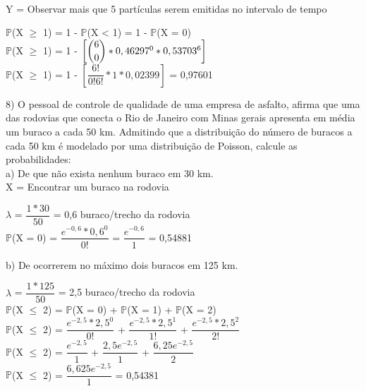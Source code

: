 \documentclass[12pt,a4paper]{article}
\begin{document}
	\vspace{0.5cm}\\
	Y = Observar mais que 5 partículas serem emitidas no intervalo de tempo
	\begin{center}
		\vspace{0.5cm}
		$\mathbb{P}$(X $\geq$ 1) = 1 -	$\mathbb{P}$(X < 1) = 1 -	$\mathbb{P}$(X = 0)
		\vspace{0.5cm}\\
		$\mathbb{P}$(X $\geq$ 1) = 1 - $\left[\dbinom{6}{0} * 0,46297^{0} * 0,53703^{6}\right]$ 
		\vspace{0.5cm}\\
		$\mathbb{P}$(X $\geq$ 1) = 1 - $\left[\dfrac{6!}{0!6!} * 1 * 0,02399\right]$ = 0,97601
	\end{center}
	\vspace{1cm}
	8) O pessoal de controle de qualidade de uma empresa de asfalto, afirma que uma das rodovias que conecta o Rio de Janeiro com Minas gerais apresenta em média um buraco a cada 50 km. Admitindo que a distribuição do número de buracos a	cada 50 km é modelado por uma distribuição de Poisson, calcule as	probabilidades:\\
	a) De que não exista nenhum buraco em 30 km.
	\vspace{0.5cm}\\
	X = Encontrar um buraco na rodovia
	\begin{center}
		\vspace{0.5cm}
		$\lambda$ = $\dfrac{1 * 30}{50}$ = 0,6 buraco/trecho da rodovia
		\vspace{1cm}\\
		$\mathbb{P}$(X = 0) = $\dfrac{e^{-0,6} * 0,6^{0}}{0!}$ = $\dfrac{e^{-0,6}}{1}$ = 0,54881
	\end{center}
	\vspace{1cm}
	b) De ocorrerem no máximo dois buracos em 125 km.
	\begin{center}
		\vspace{0.5cm}
		$\lambda$ = $\dfrac{1 * 125}{50}$ = 2,5 buraco/trecho da rodovia
		\vspace{1cm}\\
		$\mathbb{P}$(X $\leq$ 2) = $\mathbb{P}$(X = 0) + $\mathbb{P}$(X = 1) + $\mathbb{P}$(X = 2)
		\vspace{1cm}\\
		$\mathbb{P}$(X $\leq$ 2) = $\dfrac{e^{-2,5} * 2,5^{0}}{0!}$ + $\dfrac{e^{-2,5} * 2,5^{1}}{1!}$ + $\dfrac{e^{-2,5} * 2,5^{2}}{2!}$
		\vspace{1cm}\\
		$\mathbb{P}$(X $\leq$ 2) = $\dfrac{e^{-2,5}}{1}$ + $\dfrac{2,5e^{-2,5}}{1}$ + $\dfrac{6,25e^{-2,5}}{2}$
		\vspace{1cm}\\
		$\mathbb{P}$(X $\leq$ 2) = $\dfrac{6,625e^{-2,5}}{1}$ = 0,54381
	\end{center}
\end{document}
